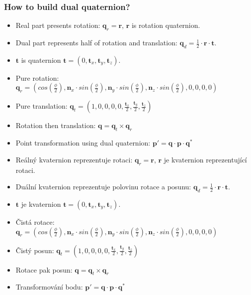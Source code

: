 \begin{frame}\frametitle{How to build dual quaternion?}\scriptsize
	\begin{itemize}
  \item Real part presents rotation: $\mathbf{q}_r = \mathbf{r}$, $\mathbf{r}$ is rotation quaternion.
  \item Dual part represents half of rotation and translation: $\mathbf{q}_d = \frac{1}{2} \cdot \mathbf{r} \cdot \mathbf{t}$.
  \item $\mathbf{t}$ is quaternion $\mathbf{t} = (0,\mathbf{t}_x,\mathbf{t}_y,\mathbf{t}_z)$.
  \item Pure rotation: $\mathbf{q}_r = \left(cos\left(\frac{\phi}{2}\right),\mathbf{n}_x \cdot sin\left(\frac{\phi}{2}\right),\mathbf{n}_y \cdot sin\left(\frac{\phi}{2}\right),\mathbf{n}_z \cdot sin\left(\frac{\phi}{2}\right),0,0,0,0\right)$
  \item Pure translation: $\mathbf{q}_t = \left(1,0,0,0,0,\frac{\mathbf{t}_x}{2},\frac{\mathbf{t}_y}{2},\frac{\mathbf{t}_z}{2}\right)$
  \item Rotation then translation: $\mathbf{q} = \mathbf{q}_t \times \mathbf{q}_r$
  \item Point transformation using dual quaternion: $\mathbf{p}' = \mathbf{q} \cdot \mathbf{p} \cdot \mathbf{q}^*$
	\end{itemize}

	\begin{itemize}
  \item Reálný kvaternion reprezentuje rotaci: $\mathbf{q}_r = \mathbf{r}$, $\mathbf{r}$ je kvaternion reprezentující rotaci.
  \item Duální kvaternion reprezentuje polovinu rotace a posunu: $\mathbf{q}_d = \frac{1}{2} \cdot \mathbf{r} \cdot \mathbf{t}$.
  \item $\mathbf{t}$ je kvaternion $\mathbf{t} = (0,\mathbf{t}_x,\mathbf{t}_y,\mathbf{t}_z)$.
  \item Čistá rotace: $\mathbf{q}_r = \left(cos\left(\frac{\phi}{2}\right),\mathbf{n}_x \cdot sin\left(\frac{\phi}{2}\right),\mathbf{n}_y \cdot sin\left(\frac{\phi}{2}\right),\mathbf{n}_z \cdot sin\left(\frac{\phi}{2}\right),0,0,0,0\right)$
  \item Čistý posun: $\mathbf{q}_t = \left(1,0,0,0,0,\frac{\mathbf{t}_x}{2},\frac{\mathbf{t}_y}{2},\frac{\mathbf{t}_z}{2}\right)$
  \item Rotace pak posun: $\mathbf{q} = \mathbf{q}_t \times \mathbf{q}_r$
  \item Transformování bodu: $\mathbf{p}' = \mathbf{q} \cdot \mathbf{p} \cdot \mathbf{q}^*$
	\end{itemize}
\end{frame}

